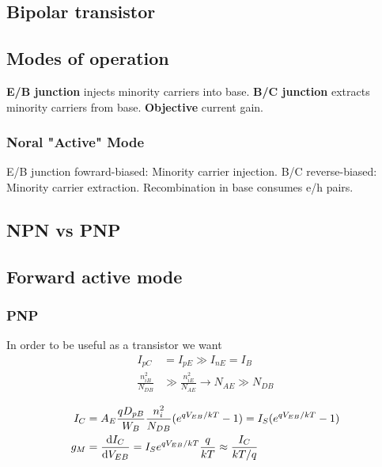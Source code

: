 \documentclass[a4paper, fontsize=8pt, landscape, DIV=1]{scrartcl}
\begin{document}
\begin{multicols*}{4}
    \section{Bipolar transistor}
    \subsection{Modes of operation}
    \textbf{E/B junction} injects minority carriers into base. \textbf{B/C junction} extracts minority carriers from base. \textbf{Objective} current gain.
    

    \subsubsection{Noral "Active" Mode}
    E/B junction fowrard-biased: Minority carrier injection. B/C reverse-biased: Minority carrier extraction.
    Recombination in base consumes e/h pairs.
    

    \subsection{NPN vs PNP}

    \subsection{Forward active mode}
    \subsubsection{PNP}

    In order to be useful as a transistor we want
    \begin{align*}
      I_{pC} &= I_{pE} \gg I_{nE} = I_B \\
      \frac{n_{iB}^2}{N_{DB}} &\gg \frac{n_{iE}^2}{N_{AE}} \to N_{AE} \gg N_{DB}
    \end{align*}


    \begin{align*}
      I_C &= A_E \frac{qD_{pB}}{W_B} \frac{n_i^2}{N_{DB}} (e^{qV_{EB}/kT} - 1) = I_S(e^{qV_{EB}/kT} - 1) \\
      g_M &= \frac{\mathrm{d}I_C}{\mathrm{d}V_{EB}} = I_S e^{qV_{EB}/kT} \frac{q}{kT} \approx \frac{I_C}{kT/q}
    \end{align*}


\end{multicols*}
\end{document}
